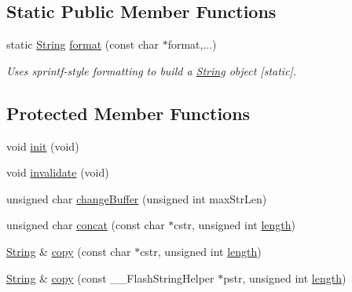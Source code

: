 \subsection*{Static Public Member Functions}
\begin{DoxyCompactItemize}
\item 
static \hyperlink{class_string}{String} \hyperlink{class_string_a0d717afd6f0ea29cc70175886b56fbd8}{format} (const char $\ast$format,...)
\begin{DoxyCompactList}\small\item\em Uses sprintf-\/style formatting to build a \hyperlink{class_string}{String} object \mbox{[}static\mbox{]}. \end{DoxyCompactList}\end{DoxyCompactItemize}
\subsection*{Protected Member Functions}
\begin{DoxyCompactItemize}
\item 
void \hyperlink{class_string_af597f6dc5a6a96d14d5409b48254b8fb}{init} (void)
\item 
void \hyperlink{class_string_a9bee9137075d66b2af742969cb7549d9}{invalidate} (void)
\item 
unsigned char \hyperlink{class_string_aea30ddc42b0dd5434d23606c39580e5d}{change\+Buffer} (unsigned int max\+Str\+Len)
\item 
unsigned char \hyperlink{class_string_aba57d3370c8e6abc90b359d62ecb6be6}{concat} (const char $\ast$cstr, unsigned int \hyperlink{class_string_a21691d4bac5ec852977018fef6fb9c8a}{length})
\item 
\hyperlink{class_string}{String} \& \hyperlink{class_string_af425a88dd132c147a97d8eca4df2be35}{copy} (const char $\ast$cstr, unsigned int \hyperlink{class_string_a21691d4bac5ec852977018fef6fb9c8a}{length})
\item 
\hyperlink{class_string}{String} \& \hyperlink{class_string_a8d349a2f3cf3c8cde32f8665660aec20}{copy} (const \+\_\+\+\_\+\+Flash\+String\+Helper $\ast$pstr, unsigned int \hyperlink{class_string_a21691d4bac5ec852977018fef6fb9c8a}{length})
\end{DoxyCompactItemize}
